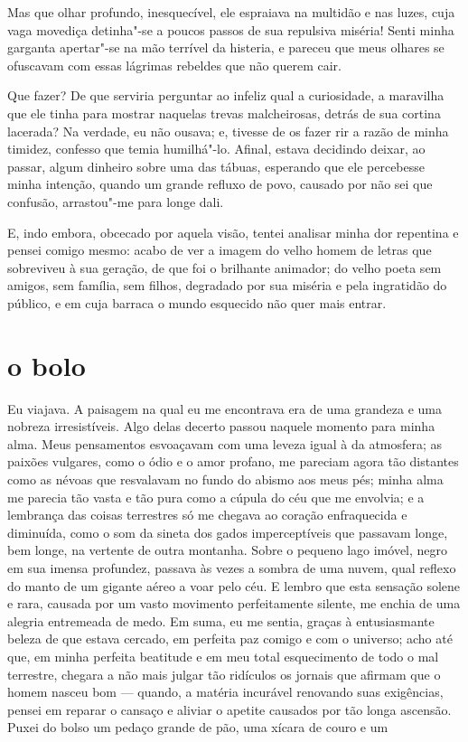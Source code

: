 Mas que olhar profundo, inesquecível, ele espraiava na multidão e
nas luzes, cuja vaga movediça detinha"-se a poucos passos de sua repulsiva
miséria! Senti minha garganta apertar"-se na mão terrível da histeria,
e pareceu que meus olhares se ofuscavam com essas lágrimas
rebeldes que não querem cair.

Que fazer? De que serviria perguntar ao infeliz qual a curiosidade,
a maravilha que ele tinha para mostrar naquelas trevas malcheirosas,
detrás de sua cortina lacerada? Na verdade, eu não ousava; e, tivesse
de os fazer rir a razão de minha timidez, confesso que temia
humilhá"-lo. Afinal, estava decidindo deixar, ao passar, algum
dinheiro sobre uma das tábuas, esperando que ele percebesse minha
intenção, quando um grande refluxo de povo, causado por não sei que
confusão, arrastou"-me para longe dali.

E, indo embora, obcecado por aquela visão, tentei analisar minha
dor repentina e pensei comigo mesmo: acabo de ver a imagem do velho homem de
letras que sobreviveu à sua geração, de que foi o brilhante animador;
do velho poeta sem amigos, sem família, sem filhos, degradado por sua
miséria e pela ingratidão do público, e em cuja barraca o mundo esquecido
não quer mais entrar.

\quebra\section[O bolo]{o bolo}

Eu viajava. A paisagem na qual eu me encontrava era de uma grandeza e uma
nobreza irresistíveis. Algo delas decerto passou naquele momento
para minha alma. Meus pensamentos esvoaçavam com uma leveza igual à da
atmosfera; as paixões vulgares, como o ódio e o amor profano, me
pareciam agora tão distantes como as névoas que resvalavam no fundo
do abismo aos meus pés; minha alma me parecia tão vasta e tão pura
como a cúpula do céu que me envolvia; e a lembrança das
coisas terrestres só me chegava ao coração enfraquecida e diminuída,
como o som da sineta dos gados imperceptíveis que passavam longe, bem
longe, na vertente de outra montanha. Sobre o pequeno lago imóvel,
negro em sua imensa profundez, passava às vezes a sombra de uma
nuvem, qual reflexo do manto de um gigante aéreo a voar pelo céu. E
lembro que esta sensação solene e rara, causada por um vasto movimento
perfeitamente silente, me enchia de uma alegria entremeada de medo.
Em suma, eu me sentia, graças à entusiasmante beleza de que estava
cercado, em perfeita paz comigo e com o universo; acho até que, em minha
perfeita beatitude e em meu total esquecimento de todo o mal terrestre,
chegara a não mais julgar tão ridículos os jornais que afirmam que o
homem nasceu bom --- quando, a matéria incurável renovando suas
exigências, pensei em reparar o cansaço e aliviar o apetite causados
por tão longa ascensão. Puxei do bolso um pedaço grande de pão, uma
xícara de couro e um

